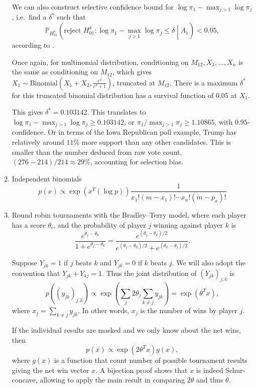 \documentclass[11pt]{article}
\newcommand{\PP}{\mathbb{P}}
\begin{document}
\begin{enumerate}
We can also construct selective confidence bound for $\log \pi_1 - \max_{j>1} \log \pi_j$, i.e.\ find a $\delta^*$ such that
$$\PP_{H_{01}^\delta} \left(\text{reject } H_{01}^\delta: \log \pi_1 - \max_{j>1} \log \pi_j \le \delta \middle| A_1\right) < 0.05,$$
according to .

Once again, for multinomial distribution, conditioning on $M_{12}, X_3, \ldots, X_n$ is the same as conditioning on $M_{12}$, which gives $X_1 \sim \text{Binomial}\left(X_1 + X_2, \frac{e^\delta}{e^\delta + 1}\right)$, truncated at $M_{12}$. There is a maximum $\delta^*$ for this truncated binomial distribution has a survival function of $0.05$ at $X_1$.

This gives $\delta^* = 0.103142$. This translates to $\log \pi_1 - \max_{j>1} \log \pi_j \ge 0.103142$, or $\pi_1 / \max_{j>1} \pi_j \ge 1.10865$, with $0.95$-confidence. Or in terms of the Iowa Republican poll example, Trump has relatively around $11\%$ more support than any other candidates. This is smaller than the number deduced from raw vote count, $\left(276 - 214\right) / 214 \approx 29\%$, accounting for selection bias.

\item Independent binomials
$$p\left(x\right) \propto \exp\left(x^T \left(\log p\right)\right) \frac{1}{x_1! \left(m-x_1\right)! \cdots x_n! \left(m-p_x\right)!}$$

\item Round robin tournaments with the Bradley--Terry model, where each player has a score $\theta_i$, and the probability of player $j$ winning against player $k$ is
$$\frac{e^{\theta_j - \theta_k}}{1 + e^{\theta_j - \theta_k}} = \frac{e^{\left(\theta_j - \theta_k\right) / 2}}{e^{\left(\theta_j - \theta_k\right) / 2} + e^{\left(\theta_k - \theta_j\right) / 2}}.$$

Suppose $Y_{jk} = 1$ if $j$ beats $k$ and $Y_{jk} = 0$ if $k$ beats $j$. We will also adopt the convention that $Y_{jk} + Y_{kj} = 1$. Thus the joint distribution of $\left(Y_{jk}\right)_{j, k}$ is
$$p\left(\left(y_{jk}\right)_{j, k}\right) \propto \exp\left(\sum_j 2\theta_j \sum_{k \ne j} y_{jk}\right)  = \exp\left(\theta^T x\right),$$
where $x_j = \sum_{k \ne j} y_{jk}$. In other words, $x_j$ is the number of wins by player $j$.

If the individual results are masked and we only know about the net wins, then
$$p\left(x\right) \propto \exp\left(2\theta^T x\right) g\left(x\right),$$
where $g\left(x\right)$ is a function that count number of possible tournament results giving the net win vector $x$. A bijection proof shows that $x$ is indeed Schur-concave, allowing to apply the main result in comparing $2\theta$ and thus $\theta$.

\end{enumerate}



\end{document}
